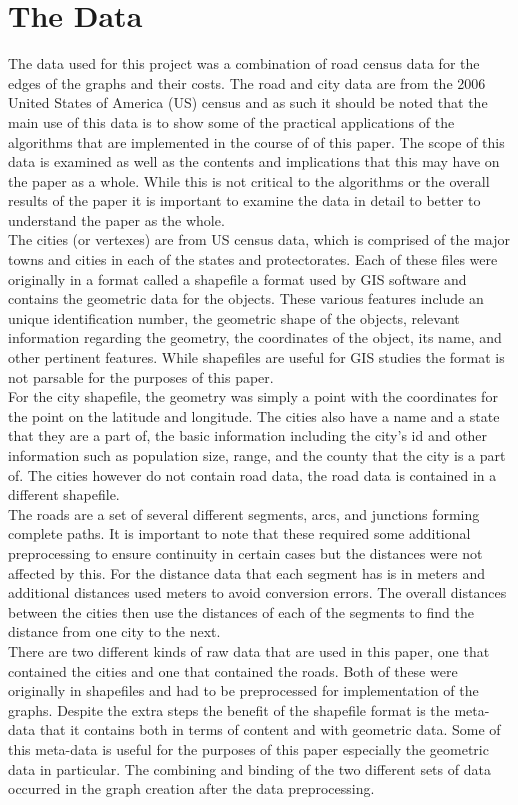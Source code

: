 \documentclass[midd]{thesis}
\newcommand{\tab}{\hspace*{2em}}
\begin{document}
\section{The Data}
\tab The data used for this project was a combination of road census data for the edges of the graphs and their costs. The road and city data are from the 2006 United States of America (US) census and as such it should be noted that the main use of this data is to show some of the practical applications of the algorithms that are implemented in the course of of this paper. The scope of this data is examined as well as the contents and implications that this may have on the paper as a whole. While this is not critical to the algorithms or the overall results of the paper it is important to examine the data in detail to better to understand the paper as the whole.\\
\tab The cities (or vertexes) are from US census data, which is comprised of the major towns and cities in each of the states and protectorates.  Each of these files were originally in a format called a shapefile a format used by GIS software and contains the geometric data for the objects. These various features include an unique identification number, the geometric shape of the objects, relevant information regarding the geometry, the coordinates of the object, its name, and other pertinent features. While shapefiles are useful for GIS studies the format is not parsable for the purposes of this paper.\\
\tab For the city shapefile, the geometry was simply a point with the coordinates for the point on the latitude and longitude. The cities also have a name and a state that they are a part of, the basic information including the city's id and other information such as population size, range, and the county that the city is a part of. The cities however do not contain road data, the road data is contained in a different shapefile.\\
\tab The roads are a set of several different segments, arcs, and junctions forming complete paths. It is important to note that these required some additional preprocessing to ensure continuity in certain cases but the distances were not affected by this. For the distance data that each segment has is in meters and additional distances used meters to avoid conversion errors. The overall distances between the cities then use the distances of each of the segments to find the distance from one city to the next.\\
\tab There are two different kinds of raw data that are used in this paper, one that contained the cities and one that contained the roads. Both of these were originally in shapefiles and had to be preprocessed for implementation of the graphs. Despite the extra steps the benefit of the shapefile format is the meta-data that it contains both in terms of content and with geometric data. Some of this meta-data is useful for the purposes of this paper especially the geometric data in particular. The combining and binding of the two different sets of data occurred in the graph creation after the data preprocessing.
\end{document}
